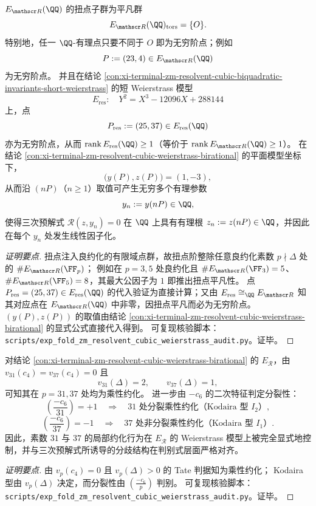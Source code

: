 \begin{conclusion}\label{con:xi-terminal-zm-resolvent-cubic-mw-point}
\(E_{\mathscr R}(\QQ)\) 的扭点子群为平凡群
\[
E_{\mathscr R}(\QQ)_{\mathrm{tors}}=\{O\}.
\]
特别地，任一 \(\QQ\)-有理点只要不同于 \(O\) 即为无穷阶点；例如
\[
P:=(23,4)\in E_{\mathscr R}(\QQ)
\]
为无穷阶点。
并且在结论 \ref{con:xi-terminal-zm-resolvent-cubic-biquadratic-invariants-short-weierstrass} 的短 Weierstrass 模型
\[
E_{\mathrm{res}}:\quad Y^2=X^3-12096X+288144
\]
上，点
\[
P_{\mathrm{res}}:=(25,37)\in E_{\mathrm{res}}(\QQ)
\]
亦为无穷阶点，从而 \(\operatorname{rank}E_{\mathrm{res}}(\QQ)\ge 1\)（等价于 \(\operatorname{rank}E_{\mathscr R}(\QQ)\ge 1\)）。
在结论 \ref{con:xi-terminal-zm-resolvent-cubic-weierstrass-birational} 的平面模型坐标下，
\[
\bigl(y(P),z(P)\bigr)=(1,-3),
\]
从而沿 \((nP)\)（\(n\ge 1\)）取值可产生无穷多个有理参数
\[
y_n:=y(nP)\in\QQ,
\]
使得三次预解式 \(\mathscr R(z,y_n)=0\) 在 \(\QQ\) 上具有有理根 \(z_n:=z(nP)\in\QQ\)，并因此在每个 \(y_n\) 处发生线性因子化。
\end{conclusion}
\begin{proof}[证明要点]
扭点注入良约化的有限域点群，故扭点阶整除任意良约化素数 \(p\nmid \Delta\) 处的 \(\#E_{\mathscr R}(\FF_p)\)；
例如在 \(p=3,5\) 处良约化且 \(\#E_{\mathscr R}(\FF_3)=5\)、\(\#E_{\mathscr R}(\FF_5)=8\)，其最大公因子为 \(1\) 即推出扭点平凡性。
点 \(P_{\mathrm{res}}=(25,37)\in E_{\mathrm{res}}(\QQ)\) 的代入验证为直接计算；又由 \(E_{\mathrm{res}}\cong_{\QQ}E_{\mathscr R}\) 知其对应点在 \(E_{\mathscr R}(\QQ)\) 中非零，因扭点平凡而必为无穷阶点。
\((y(P),z(P))\) 的取值由结论 \ref{con:xi-terminal-zm-resolvent-cubic-weierstrass-birational} 的显式公式直接代入得到。
可复现核验脚本：\texttt{scripts/exp\_fold\_zm\_resolvent\_cubic\_weierstrass\_audit.py}。证毕。
\end{proof}

\begin{conclusion}\label{con:xi-terminal-zm-resolvent-cubic-reduction-31-37}
对结论 \ref{con:xi-terminal-zm-resolvent-cubic-weierstrass-birational} 的 \(E_{\mathscr R}\)，由
\(
v_{31}(c_4)=v_{37}(c_4)=0
\)
且
\[
v_{31}(\Delta)=2,\qquad v_{37}(\Delta)=1,
\]
可知其在 \(p=31,37\) 处均为乘性约化。
进一步由 \(-c_6\) 的二次特征判定分裂性：
\[
\left(\frac{-c_6}{31}\right)=+1
\quad\Longrightarrow\quad
\text{\(31\) 处分裂乘性约化（Kodaira 型 \(I_2\)）},
\]
\[
\left(\frac{-c_6}{37}\right)=-1
\quad\Longrightarrow\quad
\text{\(37\) 处非分裂乘性约化（Kodaira 型 \(I_1\)）}.
\]
因此，素数 \(31\) 与 \(37\) 的局部约化行为在 \(E_{\mathscr R}\) 的 Weierstrass 模型上被完全显式地控制，并与三次预解式所诱导的分歧结构在判别式层面严格对齐。
\end{conclusion}
\begin{proof}[证明要点]
由 \(v_p(c_4)=0\) 且 \(v_p(\Delta)>0\) 的 Tate 判据知为乘性约化；
Kodaira 型由 \(v_p(\Delta)\) 决定，而分裂性由 \(\left(\frac{-c_6}{p}\right)\) 判别。
可复现核验脚本：\texttt{scripts/exp\_fold\_zm\_resolvent\_cubic\_weierstrass\_audit.py}。证毕。
\end{proof}

